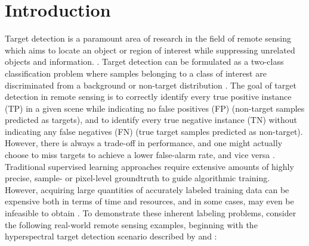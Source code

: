 \chapter{Introduction}
\vspace{1cm}

Target detection is a paramount area of research in the field of remote sensing which aims to locate an object or region of interest while suppressing unrelated objects and information. \citep{Geng2017TargetDetection,Chaudhuri1995TargetDetection}.  Target detection can be formulated as a two-class classification problem where samples belonging to a class of interest are discriminated from a background or non-target distribution \citep{Zare2016MIACE,Geng2017TargetDetection,Chaudhuri1995TargetDetection}.  The goal of target detection in remote sensing is to correctly identify every true positive instance (TP) in a given scene while indicating no false positives (FP) (non-target samples predicted as targets), and to identify every true negative instance (TN) without indicating any false negatives (FN) (true target samples predicted as non-target).  However, there is always a trade-off in performance, and one might actually choose to miss targets to achieve a lower false-alarm rate, and vice versa \citep{WeinbergerFalseAlarms}.  Traditional supervised learning approaches require extensive amounts of highly precise, sample- or pixel-level groundtruth to guide algorithmic training.  However, acquiring large quantities  of accurately labeled training data can be expensive both in terms of time and resources, and in some cases, may even be infeasible to obtain \citep{Xu2014LargeMarginWeaklySupervisedDR}.  To demonstrate these inherent labeling problems, consider the following real-world remote sensing examples, beginning with the hyperspectral target detection scenario described by \cite{Du2017Thesis} and \cite{Bocinsky2019Thesis}:

